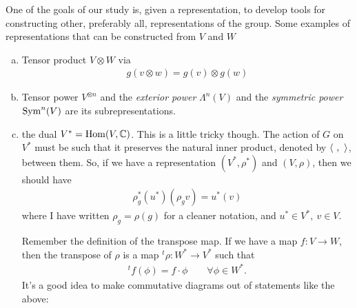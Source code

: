 One of the goals of our study is, given a representation, to develop tools for constructing other, preferably all, representations of the group. 
Some examples of representations that can be constructed from $V$ and $W$

\begin{enumerate}[(a)]
    \item Tensor product $V\otimes W$ via
        \begin{align}
            g(v\otimes w) = g(v) \otimes g(w)
        \end{align}
    \item Tensor power $V^{\otimes n}$ and the \emph{exterior power}  $\Lambda^n(V)$ and the \emph{symmetric power} $\operatorname{Sym}^n(V)$ are its subrepresentations.
    \item the dual $V^* = \operatorname{Hom}(V,\mathbb{C})$. This is a little tricky though. The action of $G$ on $V^*$ must be such that it preserves the natural inner product, denoted by $\langle\ ,\ \rangle$, between them. So, if we have a representation $(V^*,\rho^*)$ and $(V,\rho)$, then we should have
        \begin{align}
            \rho^*_g(u^*)(\rho_g v) = u^*(v)
        \end{align}
        where I have written $\rho_g=\rho(g)$ for a cleaner notation, and $u^*\in V^*,\ v\in V$. 
        \begin{insight}
            Remember the definition of the transpose map. If we have a map $f: V\to W$, then the transpose of $\rho$ is a map $^t\rho: W^*\to V^*$ such that
            \begin{align}
                ^tf(\phi) = f\cdot \phi \quad\quad\forall \phi\in W^*.
            \end{align}
            It's a good idea to make commutative diagrams out of statements like the above:
            \begin{center}
            \end{center}
        \end{insight}

\end{enumerate}
